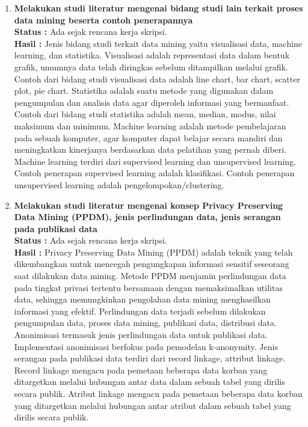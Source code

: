\documentclass[a4paper,twoside]{article}
\begin{document}
\begin{enumerate}
		\item \textbf{Melakukan studi literatur mengenai bidang studi lain terkait proses data mining beserta contoh penerapannya}\\
		{\bf Status :} Ada sejak rencana kerja skripsi.\\
		{\bf Hasil :} Jenis bidang studi terkait data mining yaitu visualisasi data, machine learning, dan statistika. Visualisasi adalah representasi data dalam bentuk grafik, umumnya data telah diringkas sebelum ditampilkan melalui grafik. Contoh dari bidang studi visualisasi data adalah line chart, bar chart, scatter plot, pie chart. Statistika adalah suatu metode yang digunakan dalam pengumpulan dan analisis data agar diperoleh informasi yang bermanfaat. Contoh dari bidang studi statistika adalah mean, median, modus, nilai maksimum dan minimum. Machine learning adalah metode pembelajaran pada sebuah komputer, agar komputer dapat belajar secara mandiri dan meningkatkan kinerjanya berdasarkan data pelatihan yang pernah diberi. Machine learning terdiri dari supervised learning dan unsupervised learning. Contoh penerapan supervised learning adalah klasifikasi. Contoh penerapan unsupervised learning adalah pengelompokan/clustering.
		
		\item \textbf{Melakukan studi literatur mengenai konsep Privacy Preserving Data Mining (PPDM), jenis perlindungan data, jenis serangan pada publikasi data}\\
		{\bf Status :} Ada sejak rencana kerja skripsi.\\
		{\bf Hasil :} Privacy Preserving Data Mining (PPDM) adalah teknik yang telah dikembangkan untuk mencegah pengungkapan informasi sensitif seseorang saat dilakukan data mining. Metode PPDM menjamin perlindungan data pada tingkat privasi tertentu bersamaan dengan memaksimalkan utilitas data, sehingga memungkinkan pengolahan data mining menghasilkan informasi yang efektif. Perlindungan data terjadi sebelum dilakukan pengumpulan data, proses data mining, publikasi data, distribusi data. Anonimisasi termasuk jenis perlindungan data untuk publikasi data. Implementasi anonimisasi berfokus pada pemodelan k-anonymity. Jenis serangan pada publikasi data terdiri dari record linkage, attribut linkage. Record linkage mengacu pada pemetaan beberapa data korban yang ditargetkan melalui hubungan antar data dalam sebuah tabel yang dirilis secara publik. Atribut linkage mengacu pada pemetaan beberapa data korban yang ditargetkan melalui hubungan antar atribut dalam sebuah tabel yang dirilis secara publik.
		

\end{enumerate}
\end{document}
